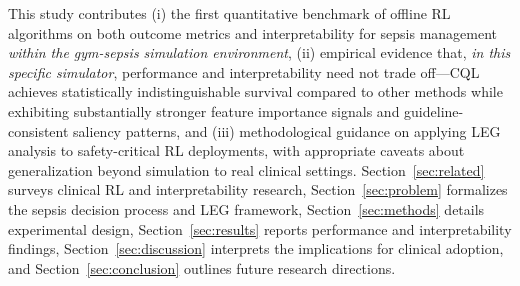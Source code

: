 This study contributes (i) the first quantitative benchmark of offline RL algorithms on both outcome metrics and interpretability for sepsis management \textit{within the gym-sepsis simulation environment}, (ii) empirical evidence that, \textit{in this specific simulator}, performance and interpretability need not trade off—CQL achieves statistically indistinguishable survival compared to other methods while exhibiting substantially stronger feature importance signals and guideline-consistent saliency patterns, and (iii) methodological guidance on applying LEG analysis to safety-critical RL deployments, with appropriate caveats about generalization beyond simulation to real clinical settings. Section~\ref{sec:related} surveys clinical RL and interpretability research, Section~\ref{sec:problem} formalizes the sepsis decision process and LEG framework, Section~\ref{sec:methods} details experimental design, Section~\ref{sec:results} reports performance and interpretability findings, Section~\ref{sec:discussion} interprets the implications for clinical adoption, and Section~\ref{sec:conclusion} outlines future research directions.

